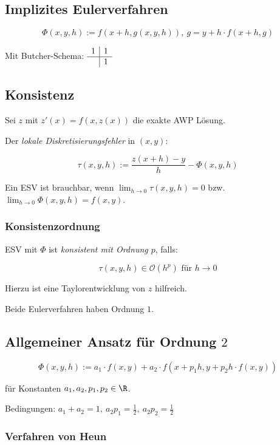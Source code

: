 \subsection*{Implizites Eulerverfahren}

$$\Phi(x,y,h) := f(x+h, g(x,y,h)), \ g = y + h \cdot f(x+h, g)$$

Mit Butcher-Schema: $\begin{array}{c|c}
1 & 1 \\
\hline
  & 1
\end{array}$


\subsection*{Konsistenz}

Sei $z$ mit $z'(x) = f(x,z(x))$ die exakte AWP Lösung.

Der \emph{lokale Diskretisierungsfehler} in $(x,y)$:

$$\tau(x,y,h) := \frac{z(x+h)-y}{h} - \Phi(x,y,h)$$

Ein ESV ist brauchbar, wenn $\lim_{h \to 0} \tau(x,y,h) = 0$ bzw. $\lim_{h \to 0} \Phi(x,y,h) = f(x,y)$.

\subsubsection*{Konsistenzordnung}

ESV mit $\Phi$ ist \emph{konsistent mit Ordnung $p$}, falls:

\vspace*{-2mm}
$$\tau(x,y,h) \in \mathcal{O}(h^p) \text{ für } h \to 0$$

Hierzu ist eine Taylorentwicklung von $z$ hilfreich.

Beide Eulerverfahren haben Ordnung $1$.

\subsection*{Allgemeiner Ansatz für Ordnung $2$}

$$\Phi(x,y,h) := a_1 \cdot f(x,y) + a_2 \cdot f(x+p_1 h, y+p_2 h \cdot f(x,y))$$

für Konstanten $a_1, a_2, p_1, p_2 \in \R$.

\spacing

Bedingungen: $a_1 + a_2 = 1, \ a_2 p_1 = \frac{1}{2}, \ a_2 p_2 = \frac{1}{2}$

\subsubsection*{Verfahren von Heun}

